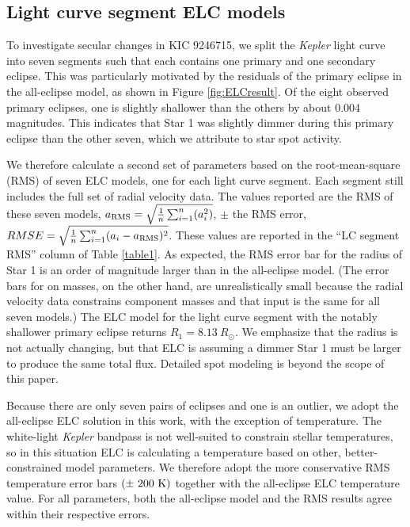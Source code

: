 \subsection{Light curve segment ELC models}\label{segment}
To investigate secular changes in KIC 9246715, we split the \emph{Kepler} light curve into seven segments such that each contains one primary and one secondary eclipse. This was particularly motivated by the residuals of the primary eclipse in the all-eclipse model, as shown in Figure \ref{fig:ELCresult}. Of the eight observed primary eclipses, one is slightly shallower than the others by about 0.004 magnitudes. This indicates that Star 1 was slightly dimmer during this primary eclipse than the other seven, which we attribute to star spot activity.

We therefore calculate a second set of parameters based on the root-mean-square (RMS) of seven ELC models, one for each light curve segment. Each segment still includes the full set of radial velocity data. The values reported are the RMS of these seven models, $a_{\rm{RMS}} = \sqrt{\frac{1}{n} \sum_{i=1}^n (a_i^2)}$, $\pm$ the RMS error, $RMSE = \sqrt{\frac{1}{n} \sum_{i=1}^n (a_i - a_{\rm{RMS}})^2}$. These values are reported in the ``LC segment RMS'' column of Table \ref{table1}. As expected, the RMS error bar for the radius of Star 1 is an order of magnitude larger than in the all-eclipse model. (The error bars for on masses, on the other hand, are unrealistically small because the radial velocity data constrains component masses and that input is the same for all seven models.) The ELC model for the light curve segment with the notably shallower primary eclipse returns $R_1 = 8.13 \ R_{\odot}$. We emphasize that the radius is not actually changing, but that ELC is assuming a dimmer Star 1 must be larger to produce the same total flux. Detailed spot modeling is beyond the scope of this paper.

Because there are only seven pairs of eclipses and one is an outlier, we adopt the all-eclipse ELC solution in this work, with the exception of temperature. The white-light \emph{Kepler} bandpass is not well-suited to constrain stellar temperatures, so in this situation ELC is calculating a temperature based on other, better-constrained model parameters. We therefore adopt the more conservative RMS temperature error bars $(\pm ~200 \ \rm{K})$ together with the all-eclipse ELC temperature value. For all parameters, both the all-eclipse model and the RMS results agree within their respective errors.
    
    
  
  
  
  
  
  
  
  
  
  
  
  
  
  
  